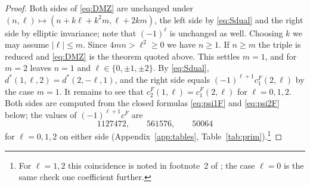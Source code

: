 \documentclass[11pt]{amsart}
\theoremstyle{definition}
\begin{document}
\begin{proof}
Both sides of \eqref{eq:DMZ} are unchanged under $(n,\ell)\mapsto(n+k\ell+k^2m,\ell+2km)$, the left side by \eqref{eq:Sdual} and the right side by elliptic invariance; note that $(-1)^\ell$ is unchanged as well. Choosing $k$ we may assume $|\ell|\le m$. Since $4mn>\ell^2\ge0$ we have $n\ge1$. If $n\ge m$ the triple is reduced and \eqref{eq:DMZ} is the theorem quoted above. This settles $m=1$, and for $m=2$ leaves $n=1$ and $\ell\in\{0,\pm1,\pm2\}$. By \eqref{eq:Sdual}, $d^*(1,\ell,2)=d^*(2,-\ell,1)$, and the right side equals $(-1)^{\ell+1}c^F_1(2,\ell)$ by the case $m=1$. It remains to see that $c^F_2(1,\ell)=c^F_1(2,\ell)$ for $\ell=0,1,2$. Both sides are computed from the closed formulas \eqref{eq:psi1F} and \eqref{eq:psi2F} below; the values of $(-1)^{\ell+1}c^F$ are
\[
1127472,\qquad 561576,\qquad 50064
\]
for $\ell=0,1,2$ on either side (Appendix~\ref{app:tables}, Table~\ref{tab:prim}).\footnote{For $\ell=1,2$ this coincidence is noted in footnote~2 of \cite{BM13}; the case $\ell=0$ is the same check one coefficient further.}
\end{proof}
\end{document}
